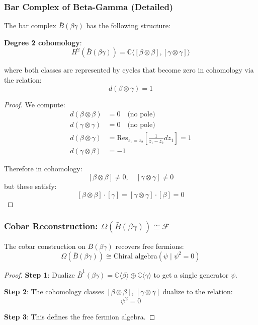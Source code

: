 \subsubsection{Bar Complex of Beta-Gamma (Detailed)}

\begin{proposition}
The bar complex $\bar{B}(\beta\gamma)$ has the following structure:

\textbf{Degree 2 cohomology}:
$$H^2(\bar{B}(\beta\gamma)) = \mathbb{C}\langle [\beta \otimes \beta], [\gamma \otimes \gamma] \rangle$$

where both classes are represented by cycles that become zero in cohomology via the relation:
$$d(\beta \otimes \gamma) = 1$$
\end{proposition}

\begin{proof}
We compute:
\begin{align}
d(\beta \otimes \beta) &= 0 \quad \text{(no pole)} \\
d(\gamma \otimes \gamma) &= 0 \quad \text{(no pole)} \\
d(\beta \otimes \gamma) &= \text{Res}_{z_1=z_2}\left[\frac{1}{z_1-z_2} dz_1\right] = 1 \\
d(\gamma \otimes \beta) &= -1
\end{align}

Therefore in cohomology:
$$[\beta \otimes \beta] \neq 0, \quad [\gamma \otimes \gamma] \neq 0$$
but these satisfy:
$$[\beta \otimes \beta] \cdot [\gamma] = [\gamma \otimes \gamma] \cdot [\beta] = 0$$
\end{proof}

\subsubsection{Cobar Reconstruction: $\Omega(\bar{B}(\beta\gamma)) \cong \mathcal{F}$}

\begin{theorem}
The cobar construction on $\bar{B}(\beta\gamma)$ recovers free fermions:
$$\Omega(\bar{B}(\beta\gamma)) \cong \text{Chiral algebra}(\psi \mid \psi^2 = 0)$$
\end{theorem}

\begin{proof}
\textbf{Step 1}: Dualize $\bar{B}^1(\beta\gamma) = \mathbb{C}\langle \beta \rangle \oplus \mathbb{C}\langle \gamma \rangle$ 
to get a single generator $\psi$.

\textbf{Step 2}: The cohomology classes $[\beta \otimes \beta]$, $[\gamma \otimes \gamma]$ dualize to the relation:
$$\psi^2 = 0$$

\textbf{Step 3}: This defines the free fermion algebra.
\end{proof}

